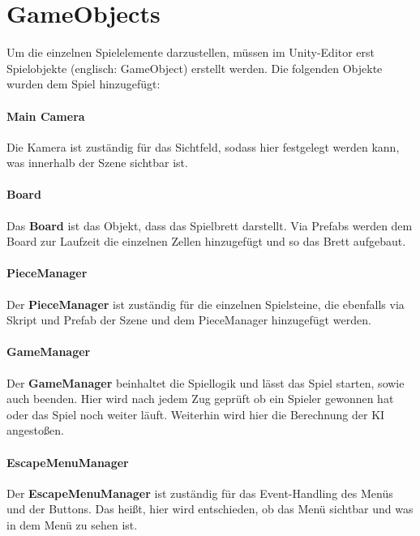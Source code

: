 \section{GameObjects}
\label{ch:Implementierung:sec:GameObjects}
Um die einzelnen Spielelemente darzustellen, müssen im Unity-Editor erst Spielobjekte (englisch: GameObject) erstellt werden. Die folgenden Objekte wurden dem Spiel hinzugefügt:
\paragraph{Main Camera}
Die Kamera ist zuständig für das Sichtfeld, sodass hier festgelegt werden kann, was innerhalb der Szene sichtbar ist.
\paragraph{Board}
Das \textbf{Board} ist das Objekt, dass das Spielbrett darstellt. Via Prefabs werden dem Board zur Laufzeit die einzelnen Zellen hinzugefügt und so das Brett aufgebaut.
\paragraph{PieceManager}
Der \textbf{PieceManager} ist zuständig für die einzelnen Spielsteine, die ebenfalls via Skript und Prefab der Szene und dem PieceManager hinzugefügt werden.
\paragraph{GameManager}
Der \textbf{GameManager} beinhaltet die Spiellogik und lässt das Spiel starten, sowie auch beenden. Hier wird nach jedem Zug geprüft ob ein Spieler gewonnen hat oder das Spiel noch weiter läuft. Weiterhin wird hier die Berechnung der KI angestoßen.
\paragraph{EscapeMenuManager}
Der \textbf{EscapeMenuManager} ist zuständig für das Event-Handling des Menüs und der Buttons. Das heißt, hier wird entschieden, ob das Menü sichtbar und was in dem Menü zu sehen ist.

